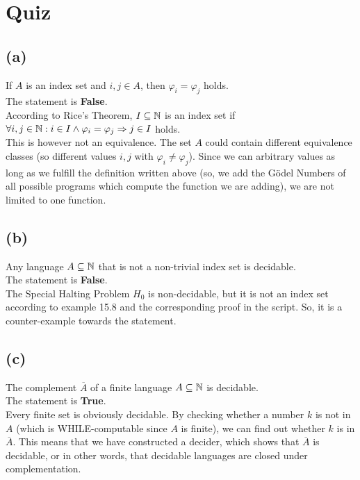 



\section{Quiz}

\subsection{(a)}
If $A$ is an index set and $i,j\in A$, then $\varphi_{i}=\varphi_{j}$ holds.\vspace{0.3cm}\\
The statement is \textbf{False}.\\
According to Rice's Theorem, $I\subseteq \mathbb{N}$ is an index set if $\forall i,j \in \mathbb{N}: i\in I \wedge \varphi_{i}=\varphi_{j} \Rightarrow j \in I$ holds.\\
This is however not an equivalence. The set $A$ could contain different equivalence classes (so different values $i,j$ with $\varphi_{i}\neq\varphi_{j}$). Since we can arbitrary values as long as we fulfill the definition written above (so, we add the Gödel Numbers of all possible programs which compute the function we are adding), we are not limited to one function.

\subsection{(b)}
Any language $A\subseteq\mathbb{N}$ that is not a non-trivial index set is decidable.\vspace{0.3cm}\\
The statement is \textbf{False}.\\
The Special Halting Problem $H_{0}$ is non-decidable, but it is not an index set according to example 15.8 and the corresponding proof in the script. So, it is a counter-example towards the statement.

\subsection{(c)}
The complement $\overline{A}$ of a finite language $A\subseteq\mathbb{N}$ is decidable.\vspace{0.3cm}\\
The statement is \textbf{True}.\\
Every finite set is obviously decidable. By checking whether a number $k$ is not in $A$ (which is \textsc{WHILE}-computable since $A$ is finite), we can find out whether $k$ is in $\overline{A}$. This means that we have constructed a decider, which shows that $\overline{A}$ is decidable, or in other words, that decidable languages are closed under complementation.

